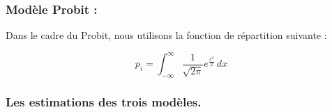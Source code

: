 \subsubsection*{Modèle Probit :} 

Dans le cadre du Probit, nous utilisons la fonction de répartition suivante : 

\[ p_i = \int_{-\infty}^{\infty} \frac{1}{\sqrt{2 \pi}} e^{\frac{x^2}{2}} \,dx \]



\subsubsection{Les estimations des trois modèles.}






